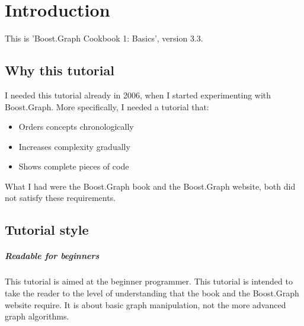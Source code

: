 \chapter{Introduction}

This is 'Boost.Graph Cookbook 1: Basics', version 3.3.

\section{Why this tutorial}

I needed this tutorial already in 2006, 
when I started experimenting with
Boost.Graph. 
More specifically, I needed a tutorial that:

\begin{itemize}
  \item Orders concepts chronologically
  \item Increases complexity gradually
  \item Shows complete pieces of code
\end{itemize}

What I had were the Boost.Graph book \cite{siek2001boost}
and the Boost.Graph website, both did not satisfy these requirements.

\section{Tutorial style}

\paragraph{Readable for beginners}

This tutorial is aimed at the beginner programmer.
This tutorial is intended to take the reader to the level of understanding
that the book \cite{siek2001boost}
and the Boost.Graph website require.
It is about basic graph manipulation, not the more advanced graph algorithms.
 
